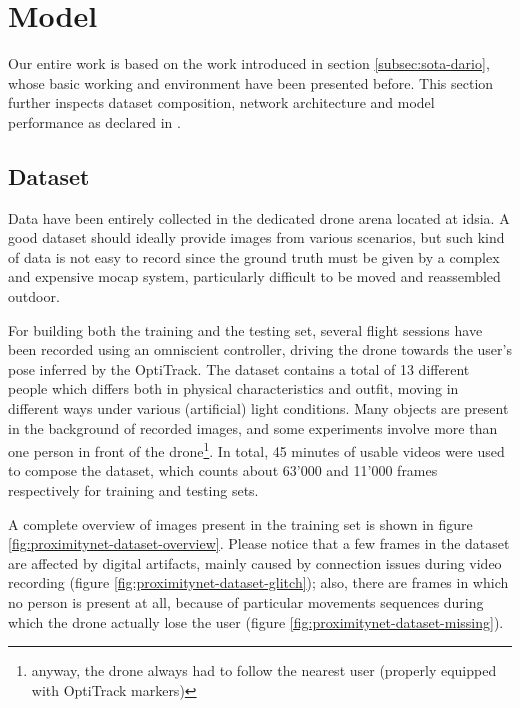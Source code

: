 \section{Model}
\label{sec:proximitynet}

Our entire work is based on the work introduced in section \ref{subsec:sota-dario}, whose basic working and environment have been presented before. This section further inspects dataset composition, network architecture and model performance as declared in \cite{mantegazza2019visionbased}.



\subsection{Dataset}
\label{subsec:proximitynet-dataset}

Data have been entirely collected in the dedicated drone arena located at \gls{idsia}. A good dataset should ideally provide images from various scenarios, but such kind of data is not easy to record since the ground truth must be given by a complex and expensive \gls{mocap} system, particularly difficult to be moved and reassembled outdoor.

For building both the training and the testing set, several flight sessions have been recorded using an omniscient controller, driving the drone towards the user's pose inferred by the OptiTrack. The dataset contains a total of 13 different people which differs both in physical characteristics and outfit, moving in different ways under various (artificial) light conditions. Many objects are present in the background of recorded images, and some experiments involve more than one person in front of the drone\footnote{anyway, the drone always had to follow the nearest user (properly equipped with OptiTrack markers)}. In total, 45 minutes of usable videos were used to compose the dataset, which counts about 63'000 and 11'000 frames respectively for training and testing sets.

A complete overview of images present in the training set is shown in figure \ref{fig:proximitynet-dataset-overview}. Please notice that a few frames in the dataset are affected by digital artifacts, mainly caused by connection issues during video recording (figure \ref{fig:proximitynet-dataset-glitch}); also, there are frames in which no person is present at all, because of particular movements sequences during which the drone actually lose the user (figure \ref{fig:proximitynet-dataset-missing}).

